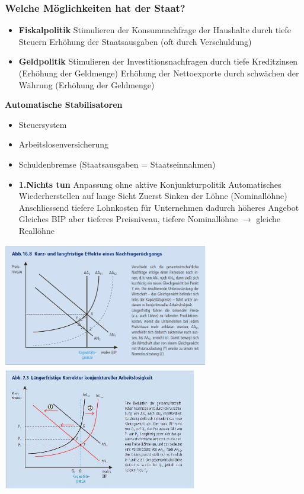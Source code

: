 \subsubsection{Welche Möglichkeiten hat der Staat?}
\begin{itemize}
    \item \textbf{Fiskalpolitik}
    \subitem Stimulieren der Konsumnachfrage der Haushalte durch tiefe Steuern
    \subitem Erhöhung der Staatsausgaben (oft durch Verschuldung) 
    \item \textbf{Geldpolitik}
    \subitem Stimulieren der Investitionsnachfragen durch tiefe Kreditzinsen (Erhöhung der Geldmenge)
    \subitem Erhöhung der Nettoexporte durch schwächen der Währung (Erhöhung der Geldmenge)
\end{itemize}
\textbf{Automatische Stabilisatoren}
\begin{itemize}
    \item Steuersystem
    \item Arbeitslosenversicherung
    \item Schuldenbremse (Staatsausgaben = Staatseinnahmen)
\end{itemize}
\clearpage
\pagebreak
	\begin{itemize}
		\item \textbf{1.Nichts tun} 
		\subitem Anpassung ohne aktive Konjunkturpolitik
		\subitem Automatisches Wiederherstellen auf lange Sicht
		\subitem Zuerst Sinken der Löhne (Nominallöhne)
		\subitem Anschliessend tiefere Lohnkosten für Unternehmen dadurch höheres Angebot
		\subitem Gleiches BIP aber tieferes Preisniveau, tiefere Nominallöhne $\rightarrow$ gleiche Reallöhne	
	\end{itemize}
	\includegraphics[width=9cm]{images/nichts.png}
    \includegraphics[width=8.5cm]{images/KorrekturKonjukArbeit}
